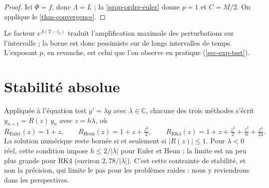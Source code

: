 \begin{proof}
Ici $\Phi=f$, donc $\Lambda=L$ ; la \cref{prop-ordre-euler} donne $p=1$ et $C=M/2$. On applique le \cref{thm-convergence}.
\end{proof}

\begin{remarque}
Le facteur $e^{\Lambda(T-t_0)}$ traduit l'amplification maximale des perturbations sur l'intervalle ; la borne est donc pessimiste sur de longs intervalles de temps. L'exposant $p$, en revanche, est celui que l'on observe en pratique (\cref{sec-exp-test}).
\end{remarque}

\section{Stabilité absolue}\label{sec-stabilite}

Appliquée à l'équation test $y'=\lambda y$ avec $\lambda\in\mathbb{C}$, chacune des trois méthodes s'écrit $y_{n+1}=R(z)\,y_n$ avec $z=h\lambda$, où
\[
  R_{\mathrm{Euler}}(z)=1+z,\qquad
  R_{\mathrm{Heun}}(z)=1+z+\tfrac{z^2}{2},\qquad
  R_{\mathrm{RK4}}(z)=1+z+\tfrac{z^2}{2}+\tfrac{z^3}{6}+\tfrac{z^4}{24}.
\]
La solution numérique reste bornée si et seulement si $|R(z)|\le1$. Pour $\lambda<0$ réel, cette condition impose $h\le 2/|\lambda|$ pour Euler et Heun ; la limite est un peu plus grande pour RK4 (environ $2{,}78/|\lambda|$). C'est cette contrainte de stabilité, et non la précision, qui limite le pas pour les problèmes raides : nous y reviendrons dans les perspectives.
